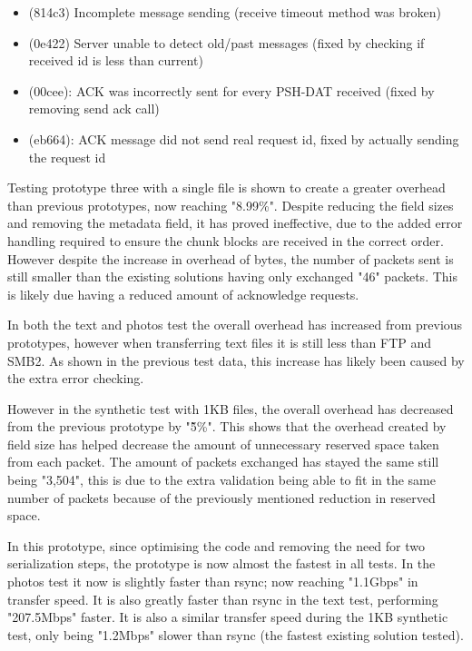 \begin{itemize}
    \item (814c3) Incomplete message sending (receive timeout method was broken)
    \item (0e422) Server unable to detect old/past messages (fixed by checking if received id is less than current)
    \item (00cee): ACK was incorrectly sent for every PSH-DAT received (fixed by removing send ack call)
    \item (eb664): ACK message did not send real request id, fixed by actually sending the request id
\end{itemize}

Testing prototype three with a single file is shown to create a greater overhead than previous prototypes, now reaching "8.99\%". Despite reducing the field sizes and removing the metadata field, it has proved ineffective, due to the added error handling required to ensure the chunk blocks are received in the correct order. However despite the increase in overhead of bytes, the number of packets sent is still smaller than the existing solutions having only exchanged "46" packets. This is likely due having a reduced amount of acknowledge requests.

In both the text and photos test the overall overhead has increased from previous prototypes, however when transferring text files it is still less than FTP and SMB2. As shown in the previous test data, this increase has likely been caused by the extra error checking.

However in the synthetic test with 1KB files, the overall overhead has decreased from the previous prototype by "\~5\%". This shows that the overhead created by field size has helped decrease the amount of unnecessary reserved space taken from each packet. The amount of packets exchanged has stayed the same still being "3,504", this is due to the extra validation being able to fit in the same number of packets because of the previously mentioned reduction in reserved space.

In this prototype, since optimising the code and removing the need for two serialization steps, the prototype is now almost the fastest in all tests. In the photos test it now is slightly faster than rsync; now reaching "1.1Gbps" in transfer speed. It is also greatly faster than rsync in the text test, performing "207.5Mbps" faster. It is also a similar transfer speed during the 1KB synthetic test, only being "1.2Mbps" slower than rsync (the fastest existing solution tested).

